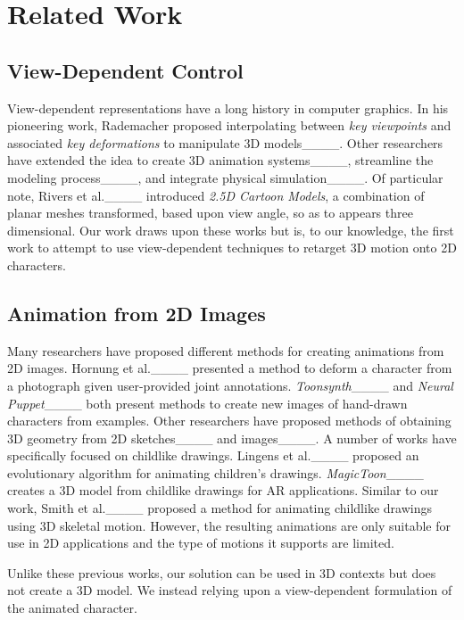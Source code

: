 \section{Related Work}
\subsection{View-Dependent Control}
View-dependent representations have a long history in computer graphics.
In his pioneering work, Rademacher proposed interpolating between \textit{key viewpoints} and associated \textit{key deformations} to manipulate 3D models____.
Other researchers have extended the idea to create 3D animation systems____, streamline the modeling process____, and integrate physical simulation____.
Of particular note, Rivers et al.____ introduced \textit{2.5D Cartoon Models}, a combination of planar meshes transformed, based upon view angle, so as to appears three dimensional.
Our work draws upon these works but is, to our knowledge, the first work to attempt to use view-dependent techniques to retarget 3D motion onto 2D characters.   

\subsection{Animation from 2D Images}

Many researchers have proposed different methods for creating animations from 2D images. Hornung et al.____ presented a method to deform a character from a photograph given user-provided joint annotations.
\textit{Toonsynth}____ and \textit{Neural Puppet}____ both present methods to create new images of hand-drawn characters from examples.
Other researchers have proposed methods of obtaining 3D geometry from 2D sketches____ and images____.
A number of works have specifically focused on childlike drawings.
Lingens et al.____ proposed an evolutionary algorithm for animating children's drawings. 
\textit{MagicToon}____ creates a 3D model from childlike drawings for AR applications.
Similar to our work, Smith et al.____ proposed a method for animating childlike drawings using 3D skeletal motion. 
However, the resulting animations are only suitable for use in 2D applications and the type of motions it supports are limited.

Unlike these previous works, our solution can be used in 3D contexts but does not create a 3D model. We instead relying upon a view-dependent formulation of the animated character.